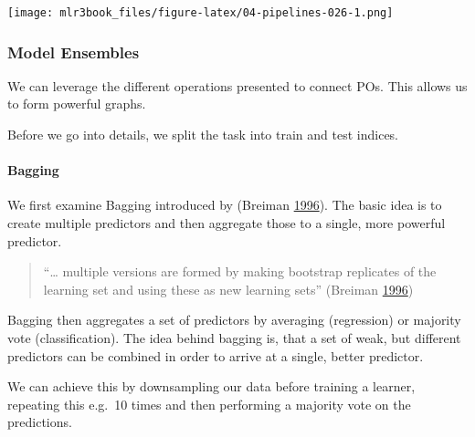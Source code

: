 \documentclass[]{article}
\newenvironment{Shaded}{}{}
\newcommand{\DecValTok}[1]{#1}
\newcommand{\KeywordTok}[1]{\textcolor[rgb]{0.00,0.00,1.00}{#1}}
\newcommand{\NormalTok}[1]{#1}
\newcommand{\OperatorTok}[1]{#1}
\newcommand{\StringTok}[1]{\textcolor[rgb]{0.00,0.50,0.50}{#1}}
\let\oldparagraph\paragraph
\renewcommand{\paragraph}[1]{\oldparagraph{#1}\mbox{}}
\renewenvironment{Shaded} {\begin{snugshade}\small} {\end{snugshade}}
\begin{document}
\texttt{[image: mlr3book\_files/figure-latex/04-pipelines-026-1.png]}

\hypertarget{pipe-model-ensembles}{%
\subsubsection{Model Ensembles}\label{pipe-model-ensembles}}

We can leverage the different operations presented to connect POs.
This allows us to form powerful graphs.

Before we go into details, we split the task into train and test indices.

\begin{Shaded}
\end{Shaded}

\hypertarget{pipe-model-ensembles-bagging}{%
\paragraph{Bagging}\label{pipe-model-ensembles-bagging}}

We first examine Bagging introduced by (Breiman \protect\hyperlink{ref-Breiman1996}{1996}).
The basic idea is to create multiple predictors and then aggregate those to a single, more powerful predictor.

\begin{quote}
``\ldots{} multiple versions are formed
by making bootstrap replicates of the learning set
and using these as new learning sets'' (Breiman \protect\hyperlink{ref-Breiman1996}{1996})
\end{quote}

Bagging then aggregates a set of predictors by averaging (regression) or majority vote (classification).
The idea behind bagging is, that a set of weak, but different predictors can be combined in order to arrive at a single, better predictor.

We can achieve this by downsampling our data before training a learner, repeating this e.g.~10 times and then performing a majority vote on the predictions.
\end{document}
